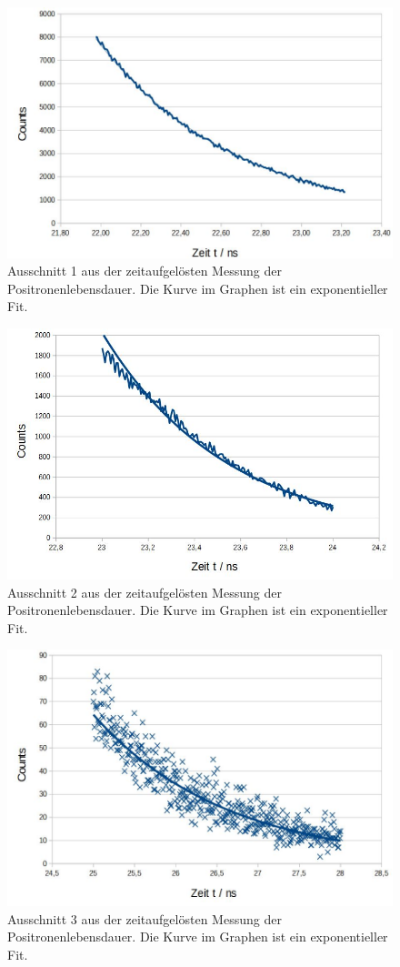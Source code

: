 \documentclass[numbers=noenddot,a4paper]{scrartcl}
\begin{document}
\begin{figure}[!h]
	\centering
	\includegraphics[width=0.7\columnwidth]{Messung2a}
	\caption{Ausschnitt 1 aus der zeitaufgelösten Messung der Positronenlebensdauer. Die Kurve im Graphen ist ein exponentieller Fit.}
\end{figure}
\begin{figure}[!h]
	\centering
	\includegraphics[width=0.7\columnwidth]{Messung2b}
	\caption{Ausschnitt 2 aus der zeitaufgelösten Messung der Positronenlebensdauer. Die Kurve im Graphen ist ein exponentieller Fit.}
\end{figure}
\begin{figure}[!h]
	\centering
	\includegraphics[width=0.7\columnwidth]{Messung2c}
	\caption{Ausschnitt 3 aus der zeitaufgelösten Messung der Positronenlebensdauer. Die Kurve im Graphen ist ein exponentieller Fit.}
\end{figure}
\end{document}
